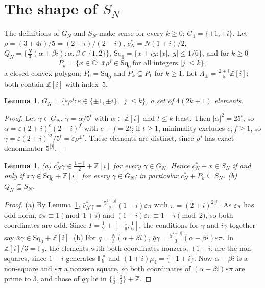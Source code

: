 \documentclass[11pt,a4paper]{amsart}
\newtheorem{lemma}[theorem]{Lemma}
\theoremstyle{remark}
\newcommand{\Z}{\mathbb{Z}}
\newcommand{\C}{\mathbb{C}}
\newcommand{\F}{\mathbb{F}}
\newcommand{\Sq}{\mathrm{Sq}}
\begin{document}
\section{The shape of \texorpdfstring{$S_N$}{S\_N}}\label{sec:shape}

The definitions of $G_N$ and $S_N$ make sense for every $k\ge0$; $G_1=\{\pm1,\pm i\}$. Let $\rho=(3+4i)/5=(2+i)/(2-i)$,
$c^*_N=N(1+i)/2$, $Q_N=\{\frac N3(\alpha+\beta i):\alpha,\beta\in\{1,2\}\}$,
$\Sq_0=\{x+iy:|x|,|y|\le1/6\}$, and for $k\ge0$
\[
P_k=\{x\in\C:\ \bar x\rho^j\in\Sq_0\ \text{for all integers }|j|\le k\},
\]
a closed convex polygon; $P_0=\Sq_0$ and $P_k\subseteq P_1$ for $k\ge1$. Let $\Lambda_\pm=\frac{2\pm i}5\Z[i]$; both
contain $\Z[i]$ with index~$5$.

\begin{lemma}\label{lem:GN}
$G_N=\{\varepsilon\rho^j:\varepsilon\in\{\pm1,\pm i\},\ |j|\le k\}$, a set of $4(2k+1)$ elements.
\end{lemma}

\begin{proof}
Let $\gamma\in G_N$, $\gamma=\alpha/5^t$ with $\alpha\in\Z[i]$ and $t\le k$ least. Then $|\alpha|^2=25^t$, so
$\alpha=\varepsilon(2+i)^e(2-i)^f$ with $e+f=2t$; if $t\ge1$, minimality excludes $e,f\ge1$, so
$\gamma=\varepsilon(2\pm i)^{2t}/5^t=\varepsilon\rho^{\pm t}$. These elements are distinct, since $\rho^j$ has exact
denominator $5^{|j|}$.
\end{proof}

\begin{lemma}\label{lem:points}
\textup{(a)} $\bar c^*_N\gamma\in\frac{1+i}2+\Z[i]$ for every $\gamma\in G_N$. Hence $c^*_N+x\in S_N$ if and only if
$\bar x\gamma\in\Sq_0+\Z[i]$ for every $\gamma\in G_N$; in particular $c^*_N+P_k\subseteq S_N$.
\textup{(b)} $Q_N\subseteq S_N$.
\end{lemma}

\begin{proof}
(a) By Lemma~\ref{lem:GN}, $\bar c^*_N\gamma=\frac{5^{k-|j|}}2(1-i)\varepsilon\pi$ with $\pi=(2\pm i)^{2|j|}$. As
$\varepsilon\pi$ has odd norm, $\varepsilon\pi\equiv1\pmod{1+i}$ and $(1-i)\varepsilon\pi\equiv1-i\pmod2$, so both
coordinates are odd. Since $I=\frac12+[-\frac16,\frac16]$, the conditions for $\gamma$ and $i\gamma$ together say
$\bar x\gamma\in\Sq_0+\Z[i]$.
(b) For $q=\frac N3(\alpha+\beta i)$, $\bar q\gamma=\frac{5^{k-|j|}}3(\alpha-\beta i)\varepsilon\pi$. In
$\Z[i]/3=\F_9$, the elements with both coordinates nonzero, $\pm1\pm i$, are the non-squares, since $1+i$
generates $\F_9^\times$ and $(1+i)\mu_4=\{\pm1\pm i\}$. Now $\alpha-\beta i$ is a non-square and $\varepsilon\pi$ a
nonzero square, so both coordinates of $(\alpha-\beta i)\varepsilon\pi$ are prime to $3$, and those of $\bar q\gamma$
lie in $\{\frac13,\frac23\}+\Z$.
\end{proof}
\end{document}
